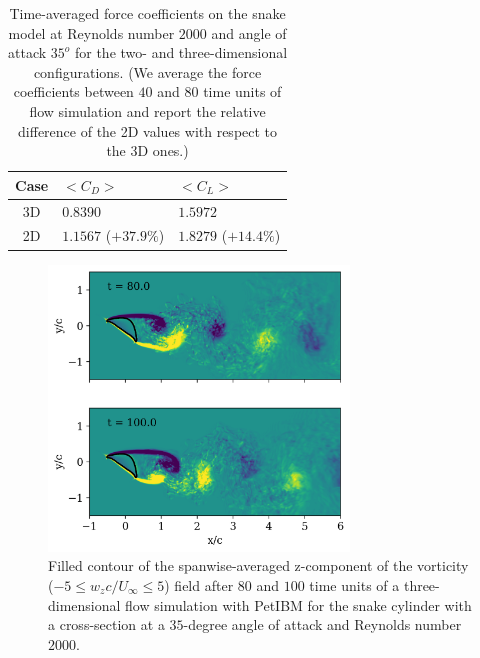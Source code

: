 \documentclass[10pt,journal,compsoc]{IEEEtran}
\begin{document}
\begin{table}[!h]
    \renewcommand{\arraystretch}{1.5}
    \caption{Time-averaged force coefficients on the snake model at Reynolds number $2000$ and angle of attack $35^o$ for the two- and three-dimensional configurations. (We average the force coefficients between $40$ and $80$ time units of flow simulation and report the relative difference of the 2D values with respect to the 3D ones.)}
    \label{tab:force_coefficients}
    \centering
    \begin{tabular}{cll}
        Case & $<C_D>$ & $<C_L>$ \\
        \hline
        3D & $0.8390$ & $1.5972$ \\
        2D & $1.1567$ ($+37.9\%$) & $1.8279$ ($+14.4\%$) \\
        \hline
    \end{tabular}
\end{table}

\begin{figure}
    \centering
    \includegraphics[width=8cm]{figures/wz_avg_multi_contourf.png}
    \caption{Filled contour of the spanwise-averaged z-component of the vorticity ($-5 \leq w_z c / U_\infty \leq 5$) field after $80$ and $100$ time units of a three-dimensional flow simulation with PetIBM for the snake cylinder with a cross-section at a $35$-degree angle of attack and Reynolds number $2000$.}
    \label{fig:wz_avg_3d}
\end{figure}
\end{document}
